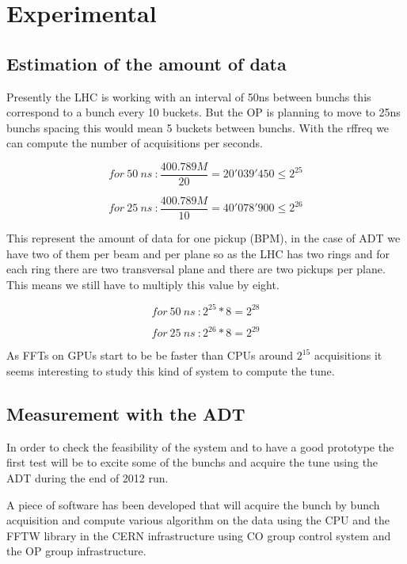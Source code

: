 %

\chapter{Experimental}

\section{Estimation of the amount of data}

Presently the \gls{LHC} is working with an interval of 50ns between \glspl{bunch} this correspond to a bunch every 10 \glspl{bucket}. But the \gls{OP} is planning to move to 25ns \glspl{bunch} spacing this would mean 5 \glspl{bucket} between \glspl{bunch}. With the \gls{rffreq} we can compute the number of acquisitions per seconds.

$$for~50~ns~: \frac{400.789M}{20} = 20'039'450 \leq 2^{25}$$

$$for~25~ns~: \frac{400.789M}{10} = 40'078'900 \leq 2^{26}$$ 

This represent the amount of data for one pickup (\gls{BPM}), in the case of \gls{ADT} we have two of them per beam and per plane so as the \gls{LHC} has two rings and for each ring there are two transversal plane and there are two pickups per plane. This means we still have to multiply this value by eight.

$$for~50~ns~: 2^{25} * 8 = 2^{28}$$

$$for~25~ns~: 2^{26} * 8 = 2^{29}$$

As \glspl{FFT} on \glspl{GPU} start to be be faster than \glspl{CPU} around $2^{15}$ acquisitions it seems interesting to study this kind of system to compute the \gls{tune}.

\section{Measurement with the ADT}

In order to check the feasibility of the system and to have a good prototype the first test will be to excite some of the \glspl{bunch} and acquire the \gls{tune} using the \gls{ADT} during the end of 2012 run.

A piece of software has been developed that will acquire the bunch by bunch acquisition and compute various algorithm on the data using the \gls{CPU} and the \gls{FFTW} library in the \gls{CERN} infrastructure using \gls{CO} group control system and the \gls{OP} group infrastructure.

